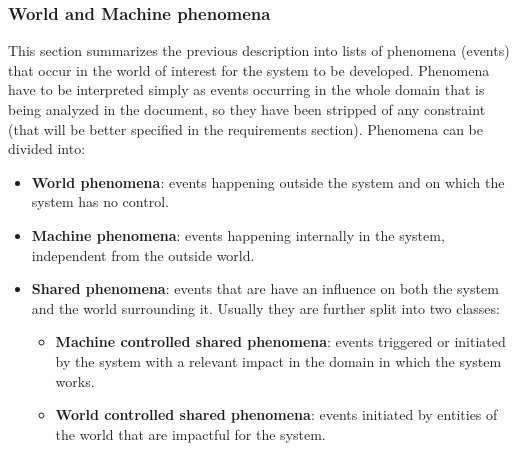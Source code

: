 \subsubsection{World and Machine phenomena}
	This section summarizes the previous description into lists of phenomena (events) that occur in the world of interest for the system to be developed. Phenomena have to be interpreted simply as events occurring in the whole domain that is being analyzed in the document, so they have been stripped of any constraint (that will be better specified in the requirements section). 
    \newline Phenomena can be divided into:
	\begin{itemize}
		\item \textbf{World phenomena}: events happening outside the system and on which the system has no control.
		\item \textbf{Machine phenomena}: events happening internally in the system, independent from the outside world.
		\item \textbf{Shared phenomena}: events that are have an influence on both the system and the world surrounding it. Usually they are further split into two classes:
		\begin{itemize}
			\item \textbf{Machine controlled shared phenomena}: events triggered or initiated by the system with a relevant impact in the domain in which the system works.
			\item \textbf{World controlled shared phenomena}: events initiated by entities of the world that are impactful for the system.
		\end{itemize}
	\end{itemize}
	
